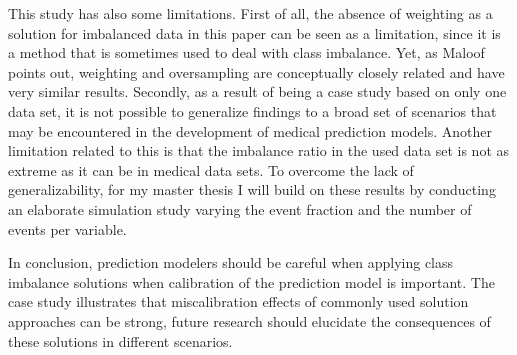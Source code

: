 \documentclass[AMA,STIX1COL, table]{WileyNJD-v2}
\begin{document}
This study has also some limitations. First of all, the absence of weighting as a solution for imbalanced data in this paper can be seen as a limitation, since it is a method that is sometimes used to deal with class imbalance.\cite{Christdoulou2019} Yet, as Maloof points out\cite{Maloof2003}, weighting and oversampling are conceptually closely related and have very similar results. Secondly, as a result of being a case study based on only one data set, it is not possible to generalize findings to a broad set of scenarios that may be encountered in the development of medical prediction models. Another limitation related to this is that the imbalance ratio in the used data set is not as extreme as it can be in medical data sets.\cite{khalilia} To overcome the lack of generalizability, for my master thesis I will build on these results by conducting an elaborate simulation study varying the event fraction and the number of events per variable. 

In conclusion, prediction modelers should be careful when applying class imbalance solutions when calibration of the prediction model is important. The case study illustrates that miscalibration effects of commonly used solution approaches can be strong, future research should elucidate the consequences of these solutions in different scenarios.   





\clearpage
\end{document}
